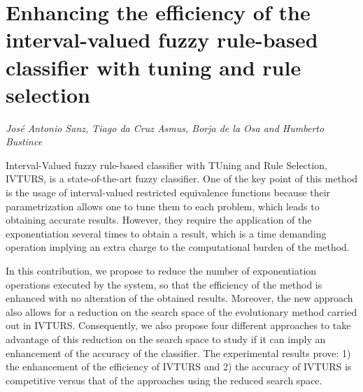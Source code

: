 \documentclass[../booklet.tex]{subfiles}
\begin{document}
\section[Enhancing the efficiency of the interval-valued fuzzy rule-based classifier with tuning and rule selection. {\it José Antonio Sanz, Tiago da Cruz Asmus, Borja de la Osa and Humberto Bustince}]{Enhancing the efficiency of the interval-valued fuzzy rule-based classifier with tuning and rule selection}
   

\begin{center}
  {\it José Antonio Sanz, Tiago da Cruz Asmus, Borja de la Osa and Humberto Bustince}
\end{center}

\vskip 0.8cm



Interval-Valued fuzzy rule-based classifier with TUning and Rule Selection, IVTURS, is a state-of-the-art fuzzy classifier.  One of the key point of this method is the usage of interval-valued restricted equivalence functions because their parametrization allows one to tune them to each problem, which leads to obtaining accurate results. However, they require the application of the exponentiation several times to obtain a result, which is a time demanding operation implying an extra charge to the computational burden of the method. 

In this contribution, we propose to reduce the number of exponentiation operations executed by the system, so that the efficiency of the method is enhanced with no alteration of the obtained results. Moreover, the new approach also allows for a reduction on the search space of the evolutionary method carried out in IVTURS. Consequently, we also propose four different approaches to take advantage of this reduction on the search space to study if it can imply an enhancement of the accuracy of the classifier. The experimental results prove: 1) the enhancement of the efficiency of IVTURS and 2) the accuracy of IVTURS is competitive versus that of the approaches using the reduced search space.



\end{document}
